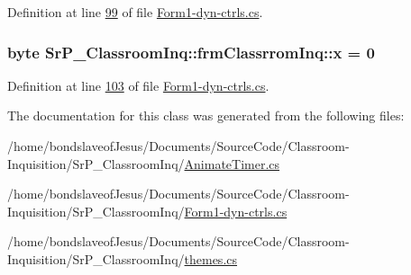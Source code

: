 \-Definition at line \hyperlink{_form1-dyn-ctrls_8cs_source_l00099}{99} of file \hyperlink{_form1-dyn-ctrls_8cs_source}{\-Form1-\/dyn-\/ctrls.\-cs}.

\hypertarget{class_sr_p___classroom_inq_1_1frm_classrrom_inq_ab6836b7a465c2251301a02d9da5c3c31}{
\subsubsection[{x}]{\setlength{\rightskip}{0pt plus 5cm}byte {\bf \-Sr\-P\-\_\-\-Classroom\-Inq\-::frm\-Classrrom\-Inq\-::x} = 0}}
\label{class_sr_p___classroom_inq_1_1frm_classrrom_inq_ab6836b7a465c2251301a02d9da5c3c31}


\-Definition at line \hyperlink{_form1-dyn-ctrls_8cs_source_l00103}{103} of file \hyperlink{_form1-dyn-ctrls_8cs_source}{\-Form1-\/dyn-\/ctrls.\-cs}.



\-The documentation for this class was generated from the following files\-:\begin{DoxyCompactItemize}
\item 
/home/bondslaveof\-Jesus/\-Documents/\-Source\-Code/\-Classroom-\/\-Inquisition/\-Sr\-P\-\_\-\-Classroom\-Inq/\hyperlink{_animate_timer_8cs}{\-Animate\-Timer.\-cs}\item 
/home/bondslaveof\-Jesus/\-Documents/\-Source\-Code/\-Classroom-\/\-Inquisition/\-Sr\-P\-\_\-\-Classroom\-Inq/\hyperlink{_form1-dyn-ctrls_8cs}{\-Form1-\/dyn-\/ctrls.\-cs}\item 
/home/bondslaveof\-Jesus/\-Documents/\-Source\-Code/\-Classroom-\/\-Inquisition/\-Sr\-P\-\_\-\-Classroom\-Inq/\hyperlink{themes_8cs}{themes.\-cs}\end{DoxyCompactItemize}

